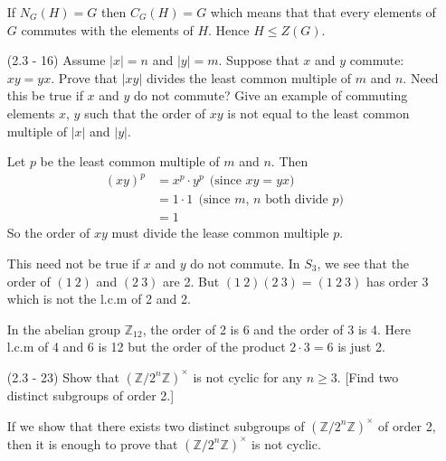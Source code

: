 \documentclass[12pt]{article}
\begin{document}
\begin{enumerate}
\begin{mybox}
    \vspace*{2mm}
    If $N_G(H)=G$ then $C_G(H)=G$ which means that
    that every elements of $G$ commutes with the
    elements of $H$. Hence $H\leq Z(G)$.
\end{mybox}


\item[(2.3 - 16)] Assume $|x| = n$ and $|y| = m$. Suppose
    that $x$ and $y$ commute: $xy = yx$. Prove that
    $|xy|$ divides the
    least common multiple of $m$ and $n$. Need this be true
    if $x$ and $y$ do not commute? Give an example of commuting
    elements $x$, $y$ such that the order of $xy$ is not
    equal to the least common multiple of $|x|$ and $|y|$.

\begin{mybox}
    
    Let $p$ be the least common multiple of $m$ and
    $n$. Then
    \begin{align*}
        (xy)^p  &=x^p\cdot y^p\ \ \text{(since $xy=yx$)}\\
                &=1\cdot 1\ \ \text{(since $m$, $n$ both divide $p$)}\\
                &=1
    \end{align*}
    So the order of $xy$ must divide the lease common
    multiple $p$.

    \vspace*{2mm}
    This need not be true if $x$ and $y$ do not commute.
    In $S_3$, we see that the order of $(1\ 2)$ and
    $(2\ 3)$ are 2. But $(1\ 2)(2\ 3)=(1\ 2\ 3)$ has order
    3 which is not the l.c.m of 2 and 2.

    \vspace*{2mm}
    In the abelian group
    $\mathbb{Z}_{12}$, the order of 2 is 6 and the order
    of 3 is 4. Here l.c.m of 4 and 6 is 12 but the order
    of the product $2\cdot 3=6$ is just 2.
\end{mybox}

    
\item[(2.3 - 23)] Show that $(\mathbb{Z}/2^n\mathbb{Z})^
{\times}$
    is not cyclic for any $n\geq 3$.
    [Find two distinct subgroups of order 2.]
  
\begin{mybox}
  
    If we show that there exists two distinct subgroups
    of $(\mathbb{Z}/2^n\mathbb{Z})^
    {\times}$ of order 2, then it is enough to prove
    that $(\mathbb{Z}/2^n\mathbb{Z})^
    {\times}$ is not cyclic.
    

\end{mybox}
\end{enumerate}
\end{document}
